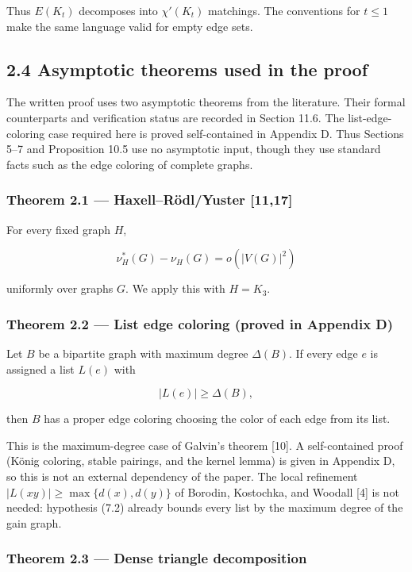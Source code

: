 \documentclass[
  american,
  11pt,
  a4paper,
]{article}
\begin{document}
Thus \(E(K_t)\) decomposes into \(\chi'(K_t)\) matchings. The conventions for \(t\le1\) make the same language valid for empty edge sets.

\subsection{2.4 Asymptotic theorems used in the proof}\label{asymptotic-theorems-used-in-the-proof}

The written proof uses two asymptotic theorems from the literature. Their formal counterparts and verification status are recorded in Section 11.6. The list-edge-coloring case required here is proved self-contained in Appendix D. Thus Sections 5--7 and Proposition 10.5 use no asymptotic input, though they use standard facts such as the edge coloring of complete graphs.

\subsubsection{Theorem 2.1 --- Haxell--Rödl/Yuster {[}11,17{]}}\label{theorem-2.1-haxellruxf6dlyuster-1117}

For every fixed graph \(H\),

\[
\nu_H^*(G)-\nu_H(G)=o(|V(G)|^2)
\]

uniformly over graphs \(G\). We apply this with \(H=K_3\).

\subsubsection{Theorem 2.2 --- List edge coloring (proved in Appendix D)}\label{theorem-2.2-list-edge-coloring-proved-in-appendix-d}

Let \(B\) be a bipartite graph with maximum degree \(\Delta(B)\). If every edge \(e\) is assigned a list \(L(e)\) with

\[
|L(e)|\ge\Delta(B),
\]

then \(B\) has a proper edge coloring choosing the color of each edge from its list.

This is the maximum-degree case of Galvin's theorem {[}10{]}. A self-contained proof (König coloring, stable pairings, and the kernel lemma) is given in Appendix D, so this is not an external dependency of the paper. The local refinement \(|L(xy)|\ge\max\{d(x),d(y)\}\) of Borodin, Kostochka, and Woodall {[}4{]} is not needed: hypothesis (7.2) already bounds every list by the maximum degree of the gain graph.

\subsubsection{Theorem 2.3 --- Dense triangle decomposition}\label{theorem-2.3-dense-triangle-decomposition}
\end{document}
